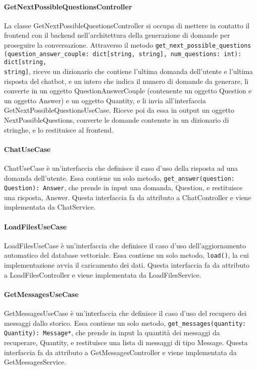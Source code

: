 \paragraph{GetNextPossibleQuestionsController}
\label{sec:get_next_possible_questions_controller}
La classe GetNextPossibleQuestionsController si occupa di mettere in contatto il frontend con il backend nell'architettura della generazione di domande per proseguire la conversazione. Attraverso il metodo \texttt{get\_next\_possible\_questions\\(question\_answer\_couple: dict[string, string], num\_questions: int): dict[string,\\ string]}, riceve un dizionario che contiene l'ultima domanda dell'utente e l'ultima risposta del chatbot, e un intero che indica il numero di domande da generare, li converte in un oggetto QuestionAnswerCouple (contenente un oggetto Question e un oggetto Answer) e un oggetto Quantity, e li invia all'interfaccia GetNextPossibleQuestionsUseCase. Riceve poi da essa in output un oggetto NextPossibleQuestions, converte le domande contenute in un dizionario di stringhe, e lo restituisce al frontend.

\newpage


\label{sec:use_case}

\paragraph{ChatUseCase}
\label{sec:chat_use_case}
ChatUseCase è un'interfaccia che definisce il caso d'uso della risposta ad una domanda dell'utente. Essa contiene un solo metodo, \texttt{get\_answer(question: Question): Answer}, che prende in input una domanda, Question, e restituisce una risposta, Answer. Questa interfaccia fa da attributo a ChatController e viene implementata da ChatService.

\paragraph{LoadFilesUseCase}
\label{sec:load_files_use_case}
LoadFilesUseCase è un'interfaccia che definisce il caso d'uso dell'aggiornamento automatico del database vettoriale. Essa contiene un solo metodo, \texttt{load()}, la cui implementazione avvia il caricamento dei dati. Questa interfaccia fa da attributo a LoadFilesController e viene implementata da LoadFilesService.

\paragraph{GetMessagesUseCase}
\label{sec:get_messages_use_case}
GetMessagesUseCase è un'interfaccia che definisce il caso d'uso del recupero dei messaggi dallo storico. Essa contiene un solo metodo, \texttt{get\_messages(quantity: Quantity): Message*}, che prende in input la quantità dei messaggi da recuperare, Quantity, e restituisce una lista di messaggi di tipo Message. Questa interfaccia fa da attributo a GetMessagesController e viene implementata da GetMessagesService.

